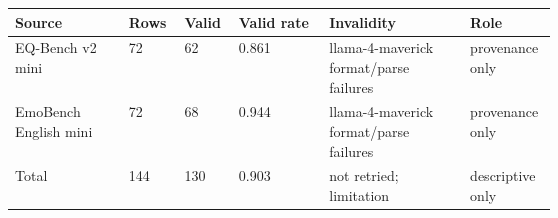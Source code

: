 \begin{tabular}{p{0.21\linewidth}lll p{0.26\linewidth}p{0.16\linewidth}}
\hline
Source & Rows & Valid & Valid rate & Invalidity & Role \\
\hline
EQ-Bench v2 mini & 72 & 62 & 0.861 & llama-4-maverick format/parse failures & provenance only \\
EmoBench English mini & 72 & 68 & 0.944 & llama-4-maverick format/parse failures & provenance only \\
Total & 144 & 130 & 0.903 & not retried; limitation & descriptive only \\
\hline
\end{tabular}
